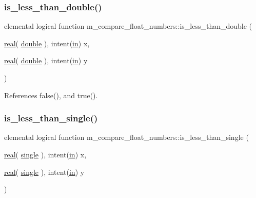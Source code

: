 \subsubsection{\texorpdfstring{is\+\_\+less\+\_\+than\+\_\+double()}{is\_less\_than\_double()}}
{\footnotesize\ttfamily elemental logical function m\+\_\+compare\+\_\+float\+\_\+numbers\+::is\+\_\+less\+\_\+than\+\_\+double (\begin{DoxyParamCaption}\item[{\hyperlink{read__watch_83_8txt_abdb62bde002f38ef75f810d3a905a823}{real}( \hyperlink{namespacem__compare__float__numbers_af4b789cd6e1a2abcd412eaf29e91ea0c}{double} ), intent(\hyperlink{M__journal_83_8txt_afce72651d1eed785a2132bee863b2f38}{in})}]{x,  }\item[{\hyperlink{read__watch_83_8txt_abdb62bde002f38ef75f810d3a905a823}{real}( \hyperlink{namespacem__compare__float__numbers_af4b789cd6e1a2abcd412eaf29e91ea0c}{double} ), intent(\hyperlink{M__journal_83_8txt_afce72651d1eed785a2132bee863b2f38}{in})}]{y }\end{DoxyParamCaption})\hspace{0.3cm}{\ttfamily [private]}}



References false(), and true().

\mbox{\label{namespacem__compare__float__numbers_a82b07d4a5f9076d2dc0655c8733549b5}} 
\subsubsection{\texorpdfstring{is\+\_\+less\+\_\+than\+\_\+single()}{is\_less\_than\_single()}}
{\footnotesize\ttfamily elemental logical function m\+\_\+compare\+\_\+float\+\_\+numbers\+::is\+\_\+less\+\_\+than\+\_\+single (\begin{DoxyParamCaption}\item[{\hyperlink{read__watch_83_8txt_abdb62bde002f38ef75f810d3a905a823}{real}( \hyperlink{namespacem__compare__float__numbers_a5f122d46d6ad7d1cf0b899d9c855c498}{single} ), intent(\hyperlink{M__journal_83_8txt_afce72651d1eed785a2132bee863b2f38}{in})}]{x,  }\item[{\hyperlink{read__watch_83_8txt_abdb62bde002f38ef75f810d3a905a823}{real}( \hyperlink{namespacem__compare__float__numbers_a5f122d46d6ad7d1cf0b899d9c855c498}{single} ), intent(\hyperlink{M__journal_83_8txt_afce72651d1eed785a2132bee863b2f38}{in})}]{y }\end{DoxyParamCaption})\hspace{0.3cm}{\ttfamily [private]}}



